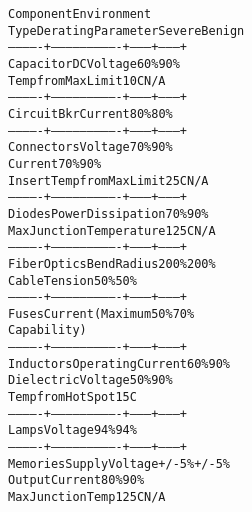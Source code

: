 \begin{boxedminipage}{\funcwidth}
\begin{alltt}
  Component  {\textbar}                            {\textbar}    Environment    {\textbar}
    Type     {\textbar}     Derating Parameter     {\textbar} Severe  {\textbar} Benign  {\textbar}
-------------+----------------------------+---------+---------+
 Capacitor   {\textbar} DC Voltage                 {\textbar}   60\%   {\textbar}   90\%   {\textbar}
             {\textbar} Temp from Max Limit        {\textbar}   10C   {\textbar}   N/A   {\textbar}
-------------+----------------------------+---------+---------+
 Circuit Bkr {\textbar} Current                    {\textbar}   80\%   {\textbar}   80\%   {\textbar}
-------------+----------------------------+---------+---------+
 Connectors  {\textbar} Voltage                    {\textbar}   70\%   {\textbar}   90\%   {\textbar}
             {\textbar} Current                    {\textbar}   70\%   {\textbar}   90\%   {\textbar}
             {\textbar} Insert Temp from Max Limit {\textbar}   25C   {\textbar}   N/A   {\textbar}
-------------+----------------------------+---------+---------+
 Diodes      {\textbar} Power Dissipation          {\textbar}   70\%   {\textbar}   90\%   {\textbar}
             {\textbar} Max Junction Temperature   {\textbar}  125C   {\textbar}   N/A   {\textbar}
-------------+----------------------------+---------+---------+
 Fiber Optics{\textbar} Bend Radius                {\textbar}  200\%   {\textbar}  200\%   {\textbar}
             {\textbar} Cable Tension              {\textbar}   50\%   {\textbar}   50\%   {\textbar}
-------------+----------------------------+---------+---------+
 Fuses       {\textbar} Current (Maximum           {\textbar}   50\%   {\textbar}   70\%   {\textbar}
             {\textbar} Capability)                {\textbar}         {\textbar}         {\textbar}
-------------+----------------------------+---------+---------+
 Inductors   {\textbar} Operating Current          {\textbar}   60\%   {\textbar}   90\%   {\textbar}
             {\textbar} Dielectric Voltage         {\textbar}   50\%   {\textbar}   90\%   {\textbar}
             {\textbar} Temp from Hot Spot         {\textbar}   15C   {\textbar}         {\textbar}
-------------+----------------------------+---------+---------+
 Lamps       {\textbar} Voltage                    {\textbar}   94\%   {\textbar}   94\%   {\textbar}
-------------+----------------------------+---------+---------+
 Memories    {\textbar} Supply Voltage             {\textbar}  +/-5\%  {\textbar}  +/-5\%  {\textbar}
             {\textbar} Output Current             {\textbar}   80\%   {\textbar}   90\%   {\textbar}
             {\textbar} Max Junction Temp          {\textbar}  125C   {\textbar}   N/A   {\textbar}

\end{alltt}
\end{boxedminipage}
